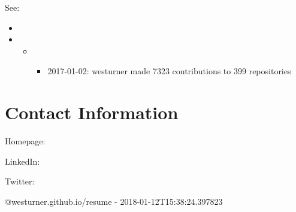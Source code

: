 \documentclass[letter,,openany,oneside,english]{sphinxhowto}
\begin{document}
See:
\begin{itemize}
\item {} 

\item {} 
\begin{itemize}
\item {} 
\begin{itemize}
\item {} 
2017-01-02: \sphinxquotedblleft{}westurner made 7323 contributions to 399 repositories\sphinxquotedblright{}

\end{itemize}

\end{itemize}

\end{itemize}


\section{Contact Information}
\label{\detokenize{resume:contact-information}}
\begin{DUlineblock}{0em}
\item[] Homepage: 
\item[] LinkedIn: 
\item[] Twitter: 
\end{DUlineblock}

@westurner.github.io/resume - 2018-01-12T15:38:24.397823

\renewcommand{\indexname}{Index}
\end{document}
